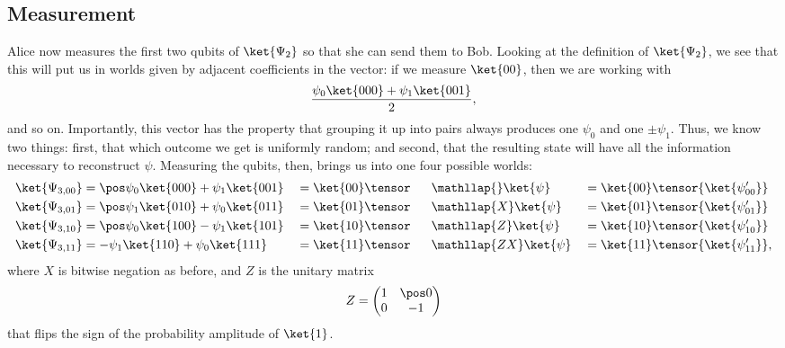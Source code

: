 \subsection{Measurement}\label{sec:measurement}
Alice now measures the first two qubits of $\ket{\Psi_2}$ so that she can send
them to Bob.  Looking at the definition of $\ket{\Psi_2}$, we see that this will
put us in worlds given by adjacent coefficients in the vector: if we measure
$\ket{00}$, then we are working with \[ \frac{\psi_0\ket{000} +
\psi_1\ket{001}}{2}, \] and so on.  Importantly, this vector has the property
that grouping it up into pairs always produces one $\psi_0$ and one
$\pm\psi_1$.  Thus, we know two things: first, that which outcome we get is
uniformly random; and second, that the resulting state will have all the
information necessary to reconstruct $\psi$.  Measuring the qubits, then, brings
us into one four possible worlds:
\begingroup
\def\ZX#1{\hphantom{ZX}\mathllap{#1}}
\begin{alignat*}{3}
  \ket{\Psi_{3,00}}
     &= \pos\psi_0\ket{000} + \psi_1\ket{001}
    &&= \ket{00} \tensor \ZX{  }\ket{\psi}
    &&= \ket{00} \tensor{\ket{\psi'_{00}}} \\
  \ket{\Psi_{3,01}}
     &= \pos\psi_1\ket{010} + \psi_0\ket{011}
    &&= \ket{01} \tensor \ZX{ X}\ket{\psi}
    &&= \ket{01} \tensor{\ket{\psi'_{01}}} \\
  \ket{\Psi_{3,10}}
     &= \pos\psi_0\ket{100} - \psi_1\ket{101}
    &&= \ket{10} \tensor \ZX{Z }\ket{\psi}
    &&= \ket{10} \tensor{\ket{\psi'_{10}}} \\
  \ket{\Psi_{3,11}}
     &=   -\psi_1\ket{110} + \psi_0\ket{111}
    &&= \ket{11} \tensor \ZX{ZX}\ket{\psi}
    &&= \ket{11} \tensor{\ket{\psi'_{11}}},
\end{alignat*}
\endgroup
where $X$ is bitwise negation as before, and $Z$ is the unitary
matrix \[ Z = \begin{pmatrix} 1 & \pos0 \\ 0 & -1 \end{pmatrix} \] that flips
the sign of the probability amplitude of $\ket{1}$.

